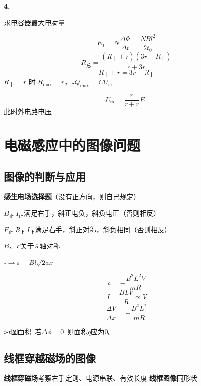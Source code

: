 \textbf{4.}

求电容器最大电荷量

\[ E_1=N\frac{\Delta\Phi}{\Delta t}=\frac{NBl^{2}}{2t_0} \]
\[ R_{\text{总}}=\frac{(R_{\text{上}}+r)(3r-R_{\text{上}})}{r+3r} \]
\[ R_{\text{上}}+r=3r-R_{\text{上}} \]
$R_{\text{上}}=r$ 时 $R_{\max}=r$，$\therefore Q_{\max}=CU_m$

\[ U_m=\frac{r}{r+r}E_1 \]
此时外电路电压  %


\section{电磁感应中的图像问题}
\subsection{图像的判断与应用}
\textbf{感生电场选择题}（没有正方向，则自己规定）

$B_{\text{正}}\ I_{\text{正}}$\quad 满足右手，斜正电负，斜负电正（否则相反）

$F_{\text{正}}\ B_{\text{正}}\ I_{\text{正}}$\quad 满足右手，斜正对称，斜负相同（否则相反）

$B$、$F$关于$X$轴对称

$\square\to$\quad $\varepsilon=Bl\sqrt{2ax}$\quad {}

\[ a=-\frac{B^2L^2V}{mR} \]
\[ I=\frac{BLV}{R}\propto V \]
\[ \frac{\Delta V}{\Delta x}=-\frac{B^2L^2}{mR} \]

$i$-$t$图面积\ 若$\Delta\phi=0$\ 则面积$q$应为$0$。

\subsection{线框穿越磁场的图像}
\textbf{线框穿磁场}\quad 考察右手定则、电源串联、有效长度 %
\textbf{线框图像}\quad 同形状

